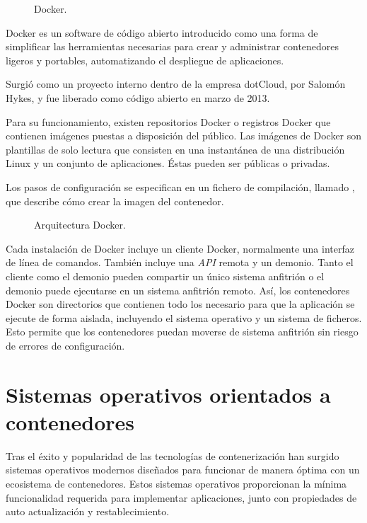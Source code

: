 \begin{figure}[H]
\caption{Docker.\label{fig:figure_placement_example}}
\end{figure}

Docker es un software de código abierto introducido como una forma de simplificar las herramientas necesarias para crear y administrar contenedores ligeros y portables, automatizando el despliegue de aplicaciones.

Surgió como un proyecto interno dentro de la empresa dotCloud, por Salomón Hykes, y fue liberado como código abierto en marzo de 2013.

Para su funcionamiento, existen repositorios Docker o registros Docker que contienen imágenes puestas a disposición del público. Las imágenes de Docker son plantillas de solo lectura que consisten en una instantánea de una distribución Linux y un conjunto de aplicaciones. Éstas pueden ser públicas o privadas.

Los pasos de configuración se especifican en un fichero de compilación, llamado , que describe cómo crear la imagen del contenedor.

\begin{figure}[H]
\caption{Arquitectura Docker.\label{fig:figure_placement_example}}
\end{figure}

Cada instalación de Docker incluye un cliente Docker, normalmente una interfaz de línea de comandos. También incluye una \textit{API} remota y un demonio. Tanto el cliente como el demonio pueden compartir un único sistema anfitrión o el demonio puede ejecutarse en un sistema anfitrión remoto. Así, los contenedores Docker son directorios que contienen todo los necesario para que la aplicación se ejecute de forma aislada, incluyendo el sistema operativo y un sistema de ficheros. Esto permite que los contenedores puedan moverse de sistema anfitrión sin riesgo de errores de configuración.

\section{Sistemas operativos orientados a contenedores}

Tras el éxito y popularidad de las tecnologías de contenerización han surgido sistemas operativos modernos diseñados para funcionar de manera óptima con un ecosistema de contenedores. Estos sistemas operativos proporcionan la mínima funcionalidad requerida para implementar aplicaciones, junto con propiedades de auto actualización y restablecimiento.

